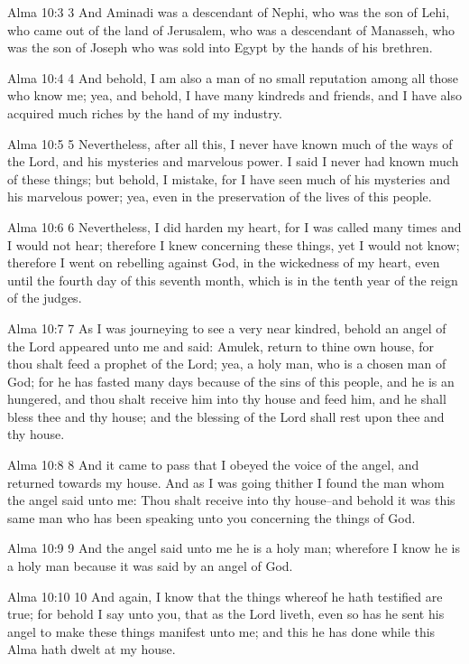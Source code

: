 Alma 10:3
 3 And Aminadi was a descendant of Nephi, who was the son of
Lehi, who came out of the land of Jerusalem, who was a descendant
of Manasseh, who was the son of Joseph who was sold into Egypt by
the hands of his brethren.

Alma 10:4
 4 And behold, I am also a man of no small reputation among all
those who know me; yea, and behold, I have many kindreds and
friends, and I have also acquired much riches by the hand of my
industry.

Alma 10:5
 5 Nevertheless, after all this, I never have known much of the
ways of the Lord, and his mysteries and marvelous power. I said
I never had known much of these things; but behold, I mistake,
for I have seen much of his mysteries and his marvelous power;
yea, even in the preservation of the lives of this people.

Alma 10:6
 6 Nevertheless, I did harden my heart, for I was called many
times and I would not hear; therefore I knew concerning these
things, yet I would not know; therefore I went on rebelling
against God, in the wickedness of my heart, even until the fourth
day of this seventh month, which is in the tenth year of the
reign of the judges.

Alma 10:7
 7 As I was journeying to see a very near kindred, behold an
angel of the Lord appeared unto me and said: Amulek, return to
thine own house, for thou shalt feed a prophet of the Lord; yea,
a holy man, who is a chosen man of God; for he has fasted many
days because of the sins of this people, and he is an hungered,
and thou shalt receive him into thy house and feed him, and he
shall bless thee and thy house; and the blessing of the Lord
shall rest upon thee and thy house.

Alma 10:8
 8 And it came to pass that I obeyed the voice of the angel, and
returned towards my house. And as I was going thither I found
the man whom the angel said unto me: Thou shalt receive into thy
house--and behold it was this same man who has been speaking unto
you concerning the things of God.

Alma 10:9
 9 And the angel said unto me he is a holy man; wherefore I know
he is a holy man because it was said by an angel of God.

Alma 10:10
 10 And again, I know that the things whereof he hath testified
are true; for behold I say unto you, that as the Lord liveth,
even so has he sent his angel to make these things manifest unto
me; and this he has done while this Alma hath dwelt at my house.

